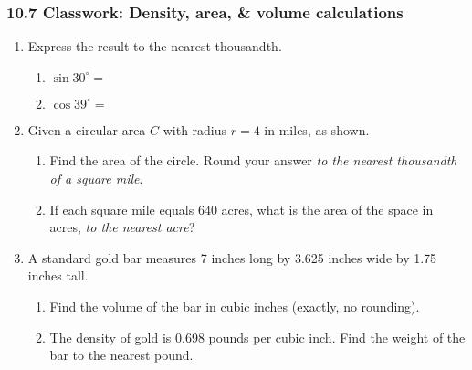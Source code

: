 \documentclass[12pt, twoside]{article}
\begin{document}
\subsubsection*{10.7 Classwork: Density, area, \& volume calculations}
 \begin{enumerate}

   \item Express the result to the nearest thousandth.  \vspace{0.5cm}
     \begin{multicols}{2}
       \begin{enumerate}
         \item $\sin 30^\circ = $
         \item $\cos 39^\circ =$
       \end{enumerate}
     \end{multicols} \vspace{0.5cm}

\item Given a circular area $C$ with radius $r=4$ in miles, as shown.

\begin{enumerate}
  \item Find the area of the circle. Round your answer \emph{to the nearest thousandth of a square mile}.\\
  \item If each square mile equals $640$ acres, what is the area of the space in acres, \emph{to the nearest acre}?
\end{enumerate} \vspace{2cm}


\item A standard gold bar measures 7 inches long by 3.625 inches wide by 1.75 inches tall.
\begin{enumerate}
  \item Find the volume of the bar in cubic inches (exactly, no rounding). \vspace{2cm}
  \item The density of gold is 0.698 pounds per cubic inch. Find the weight of the bar to the nearest pound.
\end{enumerate}


\end{enumerate}
\end{document}

